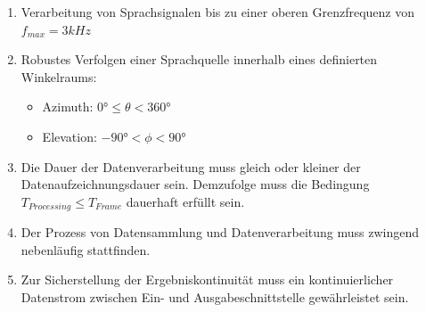 \begin{enumerate}
    \item Verarbeitung von Sprachsignalen bis zu einer oberen Grenzfrequenz von $f_{max} = 3 kHz$
    \item Robustes Verfolgen einer Sprachquelle innerhalb eines definierten Winkelraums:
        \begin{itemize}[label = \textbullet]
            \item Azimuth: $0° \leq \theta < 360°$
            \item Elevation: $-90° < \phi < 90°$
        \end{itemize}
    \item Die Dauer der Datenverarbeitung muss gleich oder kleiner der Datenaufzeichnungsdauer sein. Demzufolge muss die Bedingung $T_{Processing} \leq T_{Frame}$ dauerhaft erfüllt sein.
    \item Der Prozess von Datensammlung und Datenverarbeitung muss zwingend nebenläufig stattfinden.
    \item Zur Sicherstellung der Ergebniskontinuität muss ein kontinuierlicher Datenstrom zwischen Ein- und Ausgabeschnittstelle gewährleistet sein. 
\end{enumerate}

